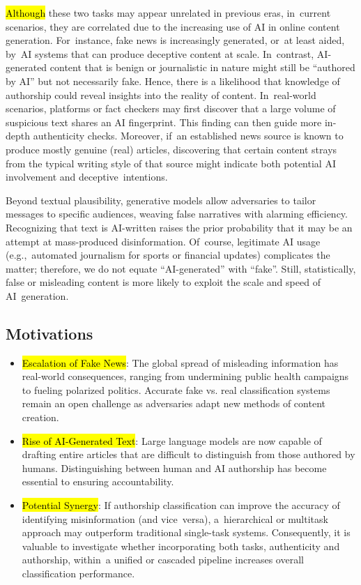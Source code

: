 \documentclass[electronics,article,accept,pdftex,moreauthors,electronics]{Definitions/mdpi}
\begin{document}
\hl{Although} %
 these two tasks may appear unrelated in previous eras, in~current scenarios, they are correlated due to the increasing use of AI in online content generation. For~instance, fake news is increasingly generated, or~at least aided, by~AI systems that can produce deceptive content at scale. In~contrast, AI-generated content that is benign or journalistic in nature might still be ``authored by AI'' but not necessarily fake. Hence, there is a likelihood that knowledge of authorship could reveal insights into the reality of content. In~real-world scenarios, platforms or fact checkers may first discover that a large volume of suspicious text shares an AI fingerprint. This finding can then guide more in-depth authenticity checks. Moreover, if~an established news source is known to produce mostly genuine (real) articles, discovering that certain content strays from the typical writing style of that source might indicate both potential AI involvement and deceptive~intentions.

Beyond textual plausibility, generative models allow adversaries to tailor messages to specific audiences, weaving false narratives with alarming efficiency. Recognizing that text is AI-written raises the prior probability that it may be an attempt at mass-produced disinformation. Of~course, legitimate AI usage (e.g.,~automated journalism for sports or financial updates) complicates the matter; therefore, we do not equate ``AI-generated'' with ``fake''. Still, statistically, false or misleading content is more likely to exploit the scale and speed of AI~generation.

\subsection{Motivations}

\begin{itemize}
    \item {\hl{Escalation of Fake News}}: The global spread of misleading information has real-world consequences, ranging from undermining public health campaigns to fueling polarized politics. Accurate fake vs. real classification systems remain an open challenge as adversaries adapt new methods of content creation.
    \item {\hl{Rise of AI-Generated Text}}: Large language models are now capable of drafting entire articles that are difficult to distinguish from those authored by humans. Distinguishing between human and AI authorship has become essential to ensuring accountability.
    \item {\hl{Potential Synergy}}: If authorship classification can improve the accuracy of identifying misinformation (and vice~versa), a~hierarchical or multitask approach may outperform traditional single-task systems. Consequently, it is valuable to investigate whether incorporating both tasks, authenticity and authorship, within~a unified or cascaded pipeline increases overall classification performance.
\end{itemize}
\end{document}
